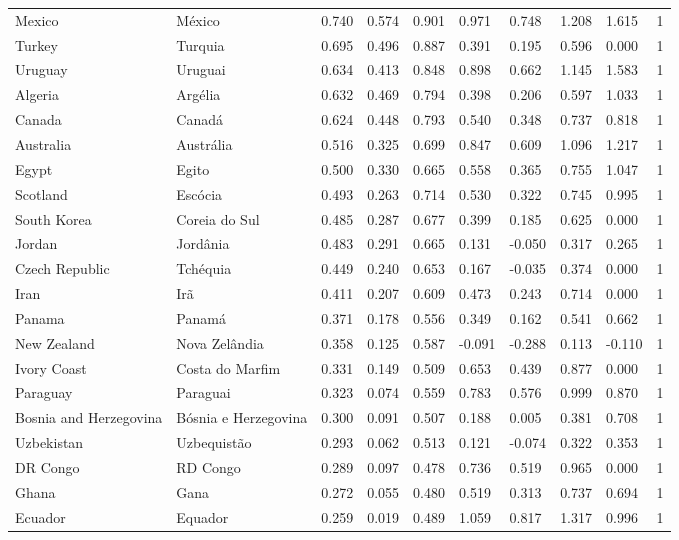\begin{tabular}{llllllllll}
Mexico & México & 0.740 & 0.574 & 0.901 & 0.971 & 0.748 & 1.208 & 1.615 & 1 \\
Turkey & Turquia & 0.695 & 0.496 & 0.887 & 0.391 & 0.195 & 0.596 & 0.000 & 1 \\
Uruguay & Uruguai & 0.634 & 0.413 & 0.848 & 0.898 & 0.662 & 1.145 & 1.583 & 1 \\
Algeria & Argélia & 0.632 & 0.469 & 0.794 & 0.398 & 0.206 & 0.597 & 1.033 & 1 \\
Canada & Canadá & 0.624 & 0.448 & 0.793 & 0.540 & 0.348 & 0.737 & 0.818 & 1 \\
Australia & Austrália & 0.516 & 0.325 & 0.699 & 0.847 & 0.609 & 1.096 & 1.217 & 1 \\
Egypt & Egito & 0.500 & 0.330 & 0.665 & 0.558 & 0.365 & 0.755 & 1.047 & 1 \\
Scotland & Escócia & 0.493 & 0.263 & 0.714 & 0.530 & 0.322 & 0.745 & 0.995 & 1 \\
South Korea & Coreia do Sul & 0.485 & 0.287 & 0.677 & 0.399 & 0.185 & 0.625 & 0.000 & 1 \\
Jordan & Jordânia & 0.483 & 0.291 & 0.665 & 0.131 & -0.050 & 0.317 & 0.265 & 1 \\
Czech Republic & Tchéquia & 0.449 & 0.240 & 0.653 & 0.167 & -0.035 & 0.374 & 0.000 & 1 \\
Iran & Irã & 0.411 & 0.207 & 0.609 & 0.473 & 0.243 & 0.714 & 0.000 & 1 \\
Panama & Panamá & 0.371 & 0.178 & 0.556 & 0.349 & 0.162 & 0.541 & 0.662 & 1 \\
New Zealand & Nova Zelândia & 0.358 & 0.125 & 0.587 & -0.091 & -0.288 & 0.113 & -0.110 & 1 \\
Ivory Coast & Costa do Marfim & 0.331 & 0.149 & 0.509 & 0.653 & 0.439 & 0.877 & 0.000 & 1 \\
Paraguay & Paraguai & 0.323 & 0.074 & 0.559 & 0.783 & 0.576 & 0.999 & 0.870 & 1 \\
Bosnia and Herzegovina & Bósnia e Herzegovina & 0.300 & 0.091 & 0.507 & 0.188 & 0.005 & 0.381 & 0.708 & 1 \\
Uzbekistan & Uzbequistão & 0.293 & 0.062 & 0.513 & 0.121 & -0.074 & 0.322 & 0.353 & 1 \\
DR Congo & RD Congo & 0.289 & 0.097 & 0.478 & 0.736 & 0.519 & 0.965 & 0.000 & 1 \\
Ghana & Gana & 0.272 & 0.055 & 0.480 & 0.519 & 0.313 & 0.737 & 0.694 & 1 \\
Ecuador & Equador & 0.259 & 0.019 & 0.489 & 1.059 & 0.817 & 1.317 & 0.996 & 1 \\

\end{tabular}
